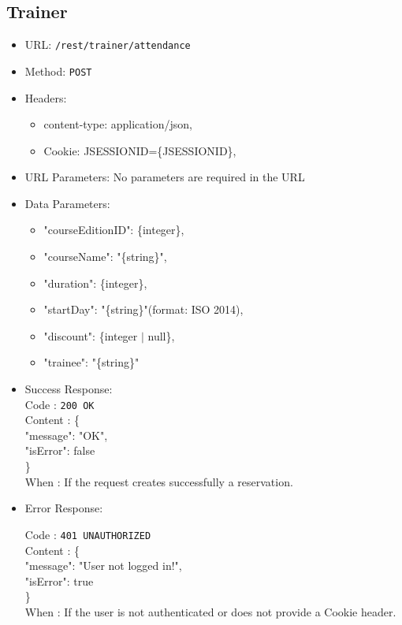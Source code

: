 \subsection*{Trainer}
\newcommand\tab[1][1cm]{\hspace*{#1}}
\begin{itemize}
	\item URL: \texttt{/rest/trainer/attendance}
	\item Method: \texttt{POST}
	\item Headers: 
	\begin{itemize}
		\item content-type: application/json,
		\item Cookie: JSESSIONID=\{JSESSIONID\},
	\end{itemize}
	\item URL Parameters: No parameters are required in the URL
	\item Data Parameters: {
	\begin{itemize}
		\item "courseEditionID": \{integer\},
		\item "courseName": "\{string\}",
		\item "duration": \{integer\},
		\item "startDay": "\{string\}"(format: ISO 2014),
		\item "discount": \{integer $|$ null\},
		\item "trainee": "\{string\}"
	\end{itemize}}
	\item Success Response:\\
	Code : \texttt{200 OK}\\
	Content : \{ \\
	\tab "message": "OK",\\
	\tab "isError": false \\
	\tab \}\\
	When : If the request creates successfully a reservation.
	
	\item Error Response:
	
	Code : \texttt{401 UNAUTHORIZED}\\
	Content : \{ \\
	\tab "message": "User not logged in!",\\
	\tab "isError": true \\
	\tab \}\\
	When : If the user is not authenticated or does not provide a Cookie header.
		

\end{itemize}
